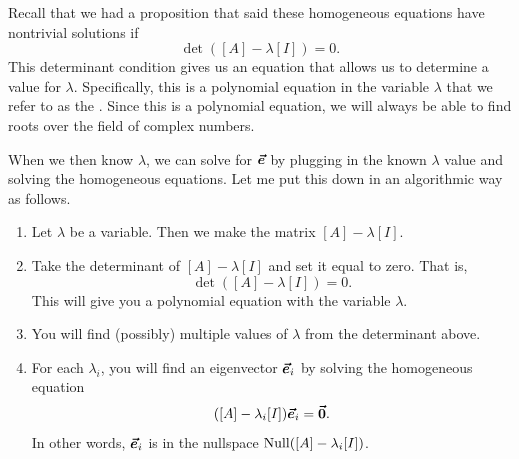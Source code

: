         Recall that we had a proposition that said these homogeneous equations have nontrivial solutions if 
        \[
        \det([A]-\lambda [I])=0.
        \]
        This determinant condition gives us an equation that allows us to determine a value for $\lambda$. Specifically, this is a polynomial equation in the variable $\lambda$ that we refer to as the . Since this is a polynomial equation, we will always be able to find roots over the field of complex numbers.
        
        When we then know $\lambda$, we can solve for $\boldsymbol{\vec{e}}$ by plugging in the known $\lambda$ value and solving the homogeneous equations. Let me put this down in an algorithmic way as follows.
        \begin{enumerate}
            \item Let $\lambda$ be a variable.  Then we make the matrix $[A]-\lambda [I]$.
            \item Take the determinant of $[A]-\lambda [I]$ and set it equal to zero. That is,
            \[
            \det([A]-\lambda [I])=0.
            \]
            This will give you a polynomial equation with the variable $\lambda$.   
            \item You will find (possibly) multiple values of $\lambda$ from the determinant above.  
            \item For each $\lambda_i$, you will find an eigenvector $\boldsymbol{\vec{e}}_i$ by solving the homogeneous equation
            \[
            ([A]-\lambda_i [I])\boldsymbol{\vec{e}}_i=\boldsymbol{\vec{0}}.
            \]
            In other words, $\boldsymbol{\vec{e}}_i$ is in the nullspace  $\mathrm{Null}([A]-\lambda_i[I])$. 
        \end{enumerate}
        
